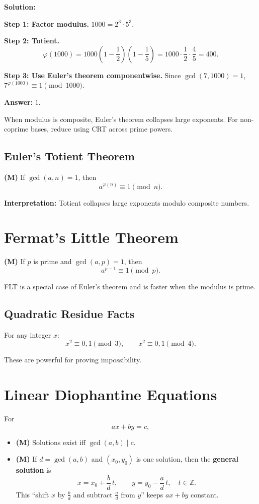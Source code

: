 \documentclass[12pt]{extarticle}
\begin{document}
	\textbf{Solution:}

	\textbf{Step 1: Factor modulus.} $1000 = 2^3 \cdot 5^3$.

	\textbf{Step 2: Totient.}
\[
\varphi(1000) = 1000\left(1-\frac12\right)\left(1-\frac15\right) = 1000 \cdot \frac12 \cdot \frac45 = 400.
\]

	\textbf{Step 3: Use Euler’s theorem componentwise.} Since $\gcd(7,1000)=1$, $7^{\varphi(1000)} \equiv 1 \pmod{1000}$.

	\textbf{Answer:} $\boxed{1}$.

\begin{remarkbox}
When modulus is composite, Euler’s theorem collapses large exponents. For non-coprime bases, reduce using CRT across prime powers.
\end{remarkbox}

\subsection*{Euler’s Totient Theorem}
\textbf{(M)} If $\gcd(a,n)=1$, then
\[
a^{\varphi(n)}\equiv1\pmod n.
\]

\textbf{Interpretation:} Totient collapses large exponents modulo composite numbers.

\section{Fermat’s Little Theorem}

\textbf{(M)} If $p$ is prime and $\gcd(a,p)=1$, then
\[
a^{p-1}\equiv1\pmod p.
\]

FLT is a special case of Euler’s theorem and is faster when the modulus is prime.

\subsection*{Quadratic Residue Facts}
For any integer $x$:
\[
x^2\equiv 0,1 \pmod 3, \qquad x^2\equiv 0,1 \pmod 4.
\]

These are powerful for proving impossibility.


\section{Linear Diophantine Equations}

For
\[
ax+by=c,
\]
\begin{itemize}
\item \textbf{(M)} Solutions exist iff $\gcd(a,b)\mid c$.
\item \textbf{(M)} If $d=\gcd(a,b)$ and $(x_0,y_0)$ is one solution, then the \textbf{general solution} is
\[
x = x_0 + \frac{b}{d}\,t, \qquad y = y_0 - \frac{a}{d}\,t, \quad t\in\mathbb{Z}.
\]
This “shift $x$ by $\tfrac{b}{d}$ and subtract $\tfrac{a}{d}$ from $y$” keeps $ax+by$ constant.
\end{itemize}
\end{document}
